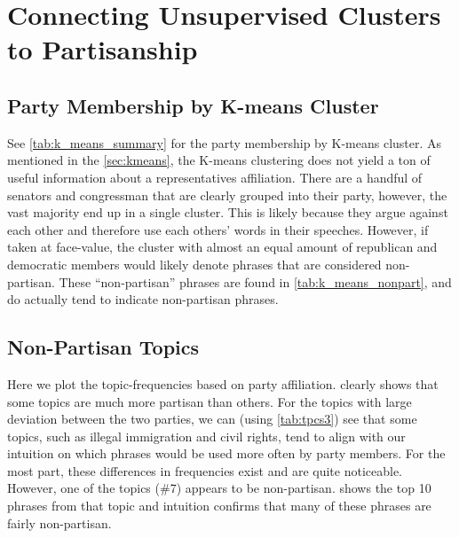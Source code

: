 \documentclass[11pt, fleqn]{article}
\begin{document}
\section{Connecting Unsupervised Clusters to Partisanship}
\subsection{Party Membership by K-means Cluster}
See \vref{tab:k_means_summary} for the party membership by K-means cluster.  As mentioned in the \cref{sec:kmeans}, the K-means clustering does not yield a ton of useful information about a representatives affiliation.  There are a handful of senators and congressman that are clearly grouped into their party, however, the vast majority end up in a single cluster.  This is likely because they argue against each other and therefore use each others' words in their speeches.  However, if taken at face-value, the cluster with almost an equal amount of republican and democratic members would likely denote phrases that are considered non-partisan.  These ``non-partisan'' phrases are found in \vref{tab:k_means_nonpart}, and do actually tend to indicate non-partisan phrases.




\subsection{Non-Partisan Topics}

Here we plot the topic-frequencies based on party affiliation.   clearly shows that some topics are much more partisan than others.  For the topics with large deviation between the two parties, we can (using \vref{tab:tpcs3}) see that some topics, such as illegal immigration and civil rights, tend to align with our intuition on which phrases would be used more often by party members.  For the most part, these differences in frequencies exist and are quite noticeable.  However, one of the topics (\#7) appears to be non-partisan.   shows the top 10 phrases from that topic and intuition confirms that many of these phrases are fairly non-partisan.
\end{document}
